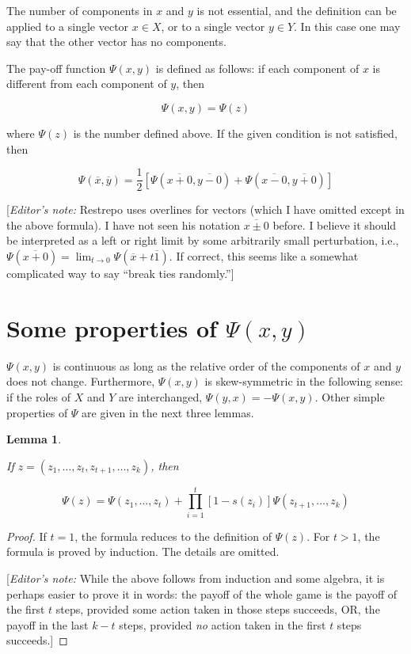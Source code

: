 \documentclass{article}
\newtheorem{lemma}{Lemma}
\theoremstyle{remark}
\begin{document}
The number of components in $x$ and $y$ is not essential, and the definition
can be applied to a single vector $x \in X$, or to a single vector $y \in Y$.
In this case one may say that the other vector has no components.

The pay-off function $\Psi(x, y)$ is defined as follows: if each component
of $x$ is different from each component of $y$, then

\[
    \Psi(x, y) = \Psi(z)
\]

where $\Psi(z)$ is the number defined above. If the given condition is not
satisfied, then

\[
    \Psi(\overline{x}, \overline{y}) = \frac{1}{2}
    [\Psi(\overline{x + 0}, \overline{y - 0}) +
    \Psi(\overline{x - 0}, \overline{y + 0})
    ]
\]

[\emph{Editor's note:} Restrepo uses overlines for vectors (which I have
omitted except in the above formula). I have not seen his notation $\overline{x
\pm 0}$ before. I believe it should be interpreted as a left or right limit by
some arbitrarily small perturbation, i.e., $\Psi(\overline{x+0}) = \lim_{t \to
0}\Psi(\overline{x} + t\overline{1})$. If correct, this seems like a somewhat
complicated way to say ``break ties randomly.'']

\section{Some properties of $\Psi(x, y)$}

$\Psi(x, y)$ is continuous as long as the relative order of the components of
$x$ and $y$ does not change. Furthermore, $\Psi(x, y)$ is skew-symmetric in the
following sense: if the roles of $X$ and $Y$ are interchanged, $\Psi(y, x) =
-\Psi(x, y)$. Other simple properties of $\Psi$ are given in the next three
lemmas.

\begin{lemma} \label{lemma:psi-recursive}

If $z = (z_1, \dots, z_t, z_{t+1}, \dots, z_k)$, then

\[
\Psi(z) = \Psi(z_1, \dots, z_t) +
\prod_{i=1}^t [1-s(z_i)] \Psi(z_{t+1}, \dots, z_k)
\]

\end{lemma}

\begin{proof}

If $t = 1$, the formula reduces to the definition of $\Psi(z)$. For $t > 1$,
the formula is proved by induction. The details are omitted.

[\emph{Editor's note:} While the above follows from induction and some algebra,
it is perhaps easier to prove it in words: the payoff of the whole game is the
payoff of the first $t$ steps, provided some action taken in those steps
succeeds, OR, the payoff in the last $k - t$ steps, provided \emph{no} action
taken in the first $t$ steps succeeds.]

\end{proof}
\end{document}
